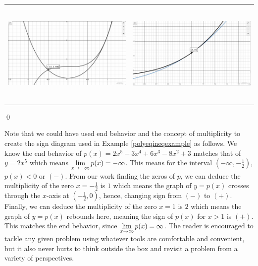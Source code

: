 \documentclass{ximera}
\begin{document}
\begin{example}
\begin{enumerate}
\begin{center}
\begin{tabular}{cc}
\includegraphics[width = 3in, height=2in]{./RealZerosGraphics/RealZerosEx03a.jpg}  &\includegraphics[width = 3in, height=2in]{./RealZerosGraphics/RealZerosEx03b.jpg}

\end{tabular}
\end{center} 

\qed
\end{enumerate}

\end{example}

Note that we could have used end behavior and the concept of multiplicity to create the sign diagram used in Example \ref{polyeqineqexample} as follows.  We know the end behavior of $p(x) = 2x^5-3x^4+6x^3-8x^2+3$ matches that of $y = 2x^5$ which means $\ds{\lim_{x \rightarrow -\infty} p(x) = -\infty}$.  This means for the interval $\left(-\infty, -\frac{1}{2}\right)$, $p(x) < 0$ or $(-)$. From our work finding the zeros of $p$, we can deduce the multiplicity of the zero $x = -\frac{1}{2}$ is $1$ which means the graph of $y = p(x)$ crosses through the $x$-axis at $\left( -\frac{1}{2}, 0 \right)$, hence, changing sign from $(-)$ to $(+)$.  Finally, we can deduce the multiplicity of the zero $x = 1$ is $2$ which means the graph of $y = p(x)$ rebounds here, meaning the sign of $p(x)$ for $x > 1$ is $(+)$.  This matches the end behavior, since $\ds{\lim_{x \rightarrow \infty} p(x) = \infty}$.  The reader is encouraged to tackle any given problem using whatever tools are comfortable and convenient, but it also never hurts to think outside the box and revisit a problem from a variety of perspectives.
\end{document}
